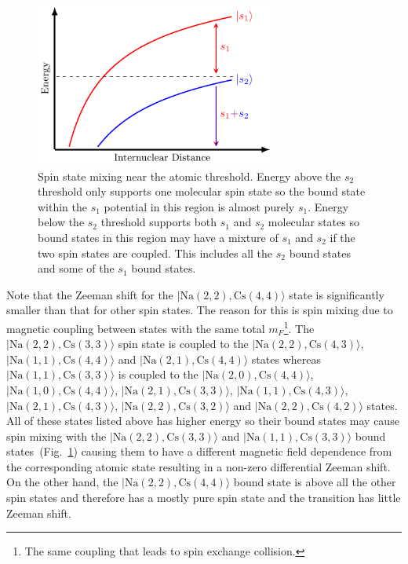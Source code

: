\begin{figure}
  \centering
  \includegraphics[width=0.7\textwidth]{figures/raman_spectroscopy_spin_mixing.pdf}
  \caption[Spin state mixing near the atomic threshold.]{
    Spin state mixing near the atomic threshold.
    Energy above the $s_2$ threshold only supports one molecular spin state
    so the bound state within the $s_1$ potential in this region is
    almost purely $s_1$.
    Energy below the $s_2$ threshold supports both $s_1$ and $s_2$ molecular states
    so bound states in this region may have a mixture of $s_1$ and $s_2$
    if the two spin states are coupled.
    This includes all the $s_2$ bound states and some of the $s_1$ bound states.
    \label{fig:raman-spectroscopy:spin-mixing}}
\end{figure}

Note that the Zeeman shift for the $|\mathrm{Na(2, 2),Cs(4, 4)}\rangle$ state
is significantly smaller than that for other spin states.
The reason for this is spin mixing due to magnetic coupling between states
with the same total $m_F$\footnote{The same coupling that leads to spin exchange collision.}.
The $|\mathrm{Na(2, 2),Cs(3, 3)}\rangle$ spin state is coupled to the
$|\mathrm{Na(2, 2),Cs(4, 3)}\rangle$, $|\mathrm{Na(1, 1),Cs(4, 4)}\rangle$
and $|\mathrm{Na(2, 1),Cs(4, 4)}\rangle$ states
whereas $|\mathrm{Na(1, 1),Cs(3, 3)}\rangle$ is coupled to the
$|\mathrm{Na(2, 0),Cs(4, 4)}\rangle$, $|\mathrm{Na(1, 0),Cs(4, 4)}\rangle$,
$|\mathrm{Na(2, 1),Cs(3, 3)}\rangle$, $|\mathrm{Na(1, 1),Cs(4, 3)}\rangle$,
$|\mathrm{Na(2, 1),Cs(4, 3)}\rangle$, $|\mathrm{Na(2, 2),Cs(3, 2)}\rangle$
and $|\mathrm{Na(2, 2),Cs(4, 2)}\rangle$ states.
All of these states listed above has higher energy so their bound states
may cause spin mixing with the $|\mathrm{Na(2, 2),Cs(3, 3)}\rangle$ and
$|\mathrm{Na(1, 1),Cs(3, 3)}\rangle$ bound states~(Fig.~\ref{fig:raman-spectroscopy:spin-mixing})
causing them to have a different magnetic field dependence from the corresponding atomic state
resulting in a non-zero differential Zeeman shift.
On the other hand, the $|\mathrm{Na(2, 2),Cs(4, 4)}\rangle$ bound state is above
all the other spin states and therefore has a mostly pure spin state
and the transition has little Zeeman shift.

